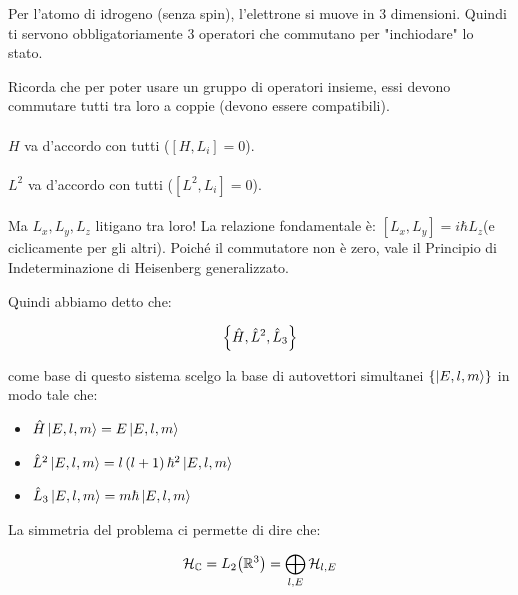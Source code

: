 	Per l'atomo di idrogeno (senza spin), l'elettrone si muove in 3 dimensioni. Quindi ti servono obbligatoriamente 3 operatori che commutano per "inchiodare" lo stato.

\begin{myapprf}

	Ricorda che per poter usare un gruppo di operatori insieme, essi devono commutare tutti tra loro a coppie (devono essere compatibili).
	\\
	\\
	$H$ va d'accordo con tutti ($[H, L_i] = 0$).
	\\
	\\
	$L^2$ va d'accordo con tutti ($[L^2, L_i] = 0$). 
	\\
	\\
	Ma $L_x, L_y, L_z$ litigano tra loro! La relazione fondamentale è: $[L_x, L_y] = i\hbar L_z$(e ciclicamente per gli altri). Poiché il commutatore non è zero, vale il Principio di Indeterminazione di Heisenberg generalizzato.

\end{myapprf}

	Quindi abbiamo detto che:
	
\begin{align*}
	\qty{\hat{H}, \hat{L}^2, \hat{L}_3}
\end{align*}
	
	come base di questo sistema scelgo la base di autovettori simultanei $\qty{\ket{E, l, m}}$ in modo tale che:
	
\begin{itemize}
	\item $ \hat{H} \ket{E, l, m} = E \ket{E, l, m} $
	\item $ \hat{L}^2 \ket{E, l, m} = l \, \qty(l + 1) \, \hbar^2 \ket{E, l, m} $
	\item $ \hat{L}_3 \ket{E, l, m} = m \hbar \ket{E, l, m} $
\end{itemize}

	La simmetria del problema ci permette di dire che:

\begin{align*}
	\mathcal{H}_{\mathbb{C}} = L_2\qty(\mathbb{R}^3) = \bigoplus_{l, E} \mathcal{H}_{l, E}
\end{align*}

